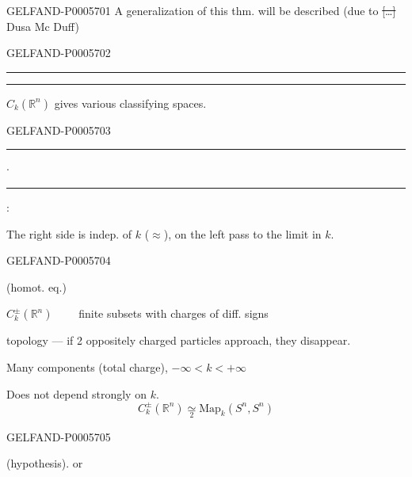 \begin{GelfandAdjacentEvidence}{GELFAND-P000570}{1}
A generalization of this thm. will be described (due to \sout{[…]} Dusa Mc Duff)
\end{GelfandAdjacentEvidence}
\begin{GelfandAdjacentEvidence}{GELFAND-P000570}{2}

\noindent\hfill\rule{.66cm}{.32pt}\enspace\rule{.64cm}{.32pt}\par
{}\quad \(C_k(\mathbb R^n)\) gives various classifying spaces.
\end{GelfandAdjacentEvidence}
\begin{GelfandAdjacentEvidence}{GELFAND-P000570}{3}

\noindent\hfill\rule{.72cm}{.32pt}\enspace\(\cdot\)\enspace\rule{.91cm}{.32pt}\par
{}:

The right side is indep. of \(k\) (\(\approx\)), on the left pass to the limit in \(k\).
\end{GelfandAdjacentEvidence}
\begin{GelfandAdjacentEvidence}{GELFAND-P000570}{4}

(homot. eq.)

\(C_k^\pm(\mathbb R^n)\qquad\) finite subsets with charges of diff. signs

topology — if 2 oppositely charged particles approach, they disappear.

Many components (total charge), \(-\infty<k<+\infty\)

Does not depend strongly on \(k\).
\[
C_k^\pm(\mathbb R^n)\underset{2}{\simeq}\mathrm{Map}_k(S^n,S^n)
\]
\end{GelfandAdjacentEvidence}
\begin{GelfandAdjacentEvidence}{GELFAND-P000570}{5}

 (hypothesis). or
\end{GelfandAdjacentEvidence}
